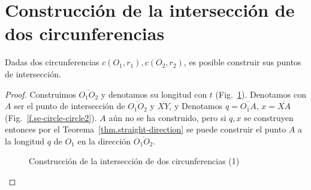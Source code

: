 \section{Construcción de la intersección de dos circunferencias}\label{s.two-circles}

\begin{theorem}
Dadas dos circunferencias $c(O_1,r_1), c(O_2,r_2)$, es posible construir sus puntos de intersección.
\end{theorem}

\begin{proof}
Construimos $\overline{O_1O_2}$ y denotamos su longitud con $t$ (Fig.~\ref{f.se-circle-circle1}).
Denotamos con $A$ ser el punto de intersección de $\overline{O_1O_2}$ y $\overline{XY}$, y Denotamos $q=\overline{O_1A}$, $x=\overline{XA}$ (Fig.~\ref{f.se-circle-circle2}). $A$ aún no se ha construido, pero si $q,x$ se construyen entonces por el Teorema~\ref{thm.straight-direction} se puede construir el punto $A$ a la longitud $q$ de $O_1$ en la dirección $\overline{O_1O_2}$.

\begin{figure}[t]
\begin{center}
\end{center}
\caption{Construcción de la intersección de dos circunferencias (1)}\label{f.se-circle-circle1}
\end{figure}


\end{proof}
